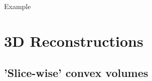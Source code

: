 \documentclass{beamer}
\begin{document}
\begin{frame}{Example}
    \begin{figure}[H]
        \begin{floatrow}
        \end{floatrow}
    \end{figure}
\end{frame}

\section{3D Reconstructions}

\subsection{'Slice-wise' convex volumes}
\end{document}
